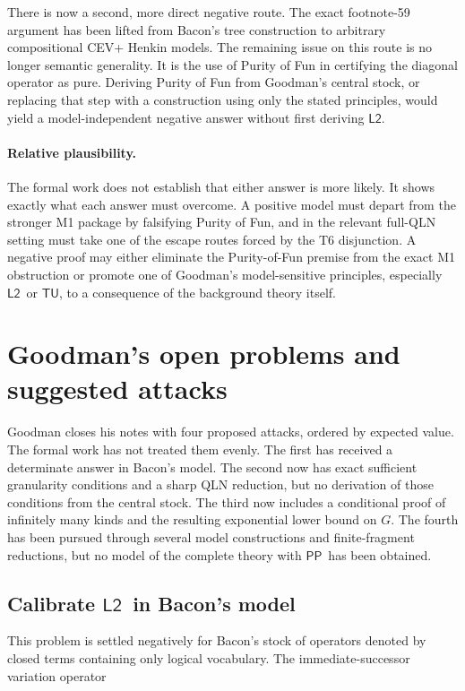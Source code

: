 \documentclass[12pt,leqno]{article}
\theoremstyle{plain}
\theoremstyle{definition}
\newcommand{\PP}{\ensuremath{\mathsf{PP}}}
\newcommand{\Ltwo}{\ensuremath{\mathsf{L2}}}
\newcommand{\TU}{\ensuremath{\mathsf{TU}}}
\begin{document}
There is now a second, more direct negative route.  The exact footnote-59
argument has been lifted from Bacon's tree construction to arbitrary
compositional CEV+ Henkin models.  The remaining issue on this route is no
longer semantic generality.  It is the use of Purity of Fun in certifying the
diagonal operator as pure.  Deriving Purity of Fun from Goodman's central
stock, or replacing that step with a construction using only the stated
principles, would yield a model-independent negative answer without first
deriving \Ltwo.

\paragraph{Relative plausibility.}
The formal work does not establish that either answer is more likely.  It
shows exactly what each answer must overcome.  A positive model must depart
from the stronger M1 package by falsifying Purity of Fun, and in the relevant
full-QLN setting must take one of the escape routes forced by the T6
disjunction.  A negative proof may either eliminate the Purity-of-Fun premise
from the exact M1 obstruction or promote one of Goodman's model-sensitive
principles, especially \Ltwo\ or \TU, to a consequence of the background
theory itself.

\section{Goodman's open problems and suggested attacks}

Goodman closes his notes with four proposed attacks, ordered by expected
value.  The formal work has not treated them evenly.  The first has received
a determinate answer in Bacon's model.  The second now has exact sufficient
granularity conditions and a sharp QLN reduction, but no derivation of those
conditions from the central stock.  The third now includes a conditional
proof of infinitely many kinds and the resulting exponential lower bound on
\(G\).  The fourth has been pursued through
several model constructions and finite-fragment reductions, but no model of
the complete theory with \PP\ has been obtained.

\subsection{Calibrate \Ltwo\ in Bacon's model}

This problem is settled negatively for Bacon's stock of operators denoted by
closed terms containing only logical vocabulary.  The immediate-successor
variation operator
\end{document}
